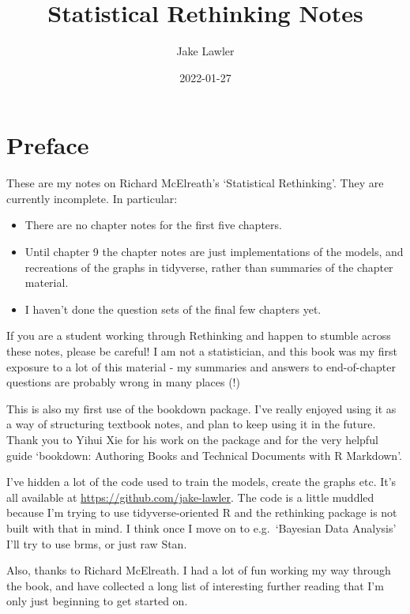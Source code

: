 \documentclass[
]{book}
\title{Statistical Rethinking Notes}
\author{Jake Lawler}
\date{2022-01-27}
\providecommand{\tightlist}{%
  \setlength{\itemsep}{0pt}\setlength{\parskip}{0pt}}
\begin{document}
\maketitle

{
\setcounter{tocdepth}{1}
\tableofcontents
}
\hypertarget{preface}{%
\chapter*{Preface}\label{preface}}

These are my notes on Richard McElreath's `Statistical Rethinking'. They are currently incomplete. In particular:

\begin{itemize}
\tightlist
\item
  There are no chapter notes for the first five chapters.
\item
  Until chapter 9 the chapter notes are just implementations of the models, and recreations of the graphs in tidyverse, rather than summaries of the chapter material.
\item
  I haven't done the question sets of the final few chapters yet.
\end{itemize}

If you are a student working through Rethinking and happen to stumble across these notes, please be careful! I am not a statistician, and this book was my first exposure to a lot of this material - my summaries and answers to end-of-chapter questions are probably wrong in many places (!)

This is also my first use of the bookdown package. I've really enjoyed using it as a way of structuring textbook notes, and plan to keep using it in the future. Thank you to Yihui Xie for his work on the package and for the very helpful guide `bookdown: Authoring Books and Technical Documents with R Markdown'.

I've hidden a lot of the code used to train the models, create the graphs etc. It's all available at \url{https://github.com/jake-lawler}. The code is a little muddled because I'm trying to use tidyverse-oriented R and the rethinking package is not built with that in mind. I think once I move on to e.g.~`Bayesian Data Analysis' I'll try to use brms, or just raw Stan.

Also, thanks to Richard McElreath. I had a lot of fun working my way through the book, and have collected a long list of interesting further reading that I'm only just beginning to get started on.
\end{document}
